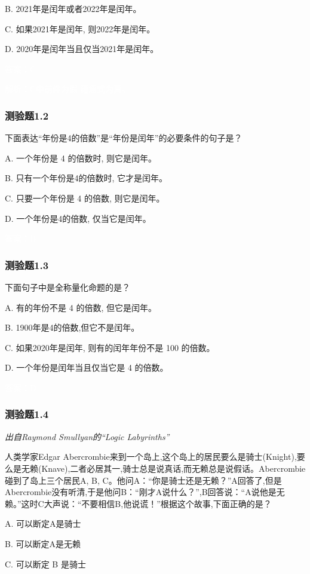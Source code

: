 \documentclass[UTF8, heading=true]{ctexart}
\begin{document}
B. 2021年是闰年或者2022年是闰年。

C. 如果2021年是闰年, 则2022年是闰年。

D. 2020年是闰年当且仅当2021年是闰年。

\textcolor{white}{答案：C}

\textcolor{white}{解析：C中前件为假,蕴涵式为真。}

\subsubsection{测验题1.2}
下面表达“年份是4的倍数”是“年份是闰年”的必要条件的句子是？

A. 一个年份是 4 的倍数时, 则它是闰年。

B. 只有一个年份是4的倍数时, 它才是闰年。

C. 只要一个年份是 4 的倍数, 则它是闰年。

D. 一个年份是4的倍数, 仅当它是闰年。

\textcolor{white}{答案：B}

\subsubsection{测验题1.3}

下面句子中是全称量化命题的是？

A. 有的年份不是 4 的倍数, 但它是闰年。

B. 1900年是4的倍数,但它不是闰年。

C. 如果2020年是闰年, 则有的闰年年份不是 100 的倍数。

D. 一个年份是闰年当且仅当它是 4 的倍数。

\textcolor{white}{答案：D}

\subsubsection{测验题1.4}

\textit{出自Raymond Smullyan的``Logic Labyrinths''}

人类学家Edgar Abercrombie来到一个岛上,这个岛上的居民要么是骑士(Knight),要么是无赖(Knave),二者必居其一,骑士总是说真话,而无赖总是说假话。Abercrombie碰到了岛上三个居民A, B, C。他问A：“你是骑士还是无赖？”A回答了,但是Abercrombie没有听清,于是他问B：“刚才A说什么？”,B回答说：“A说他是无赖。”这时C大声说：“不要相信B,他说谎！”根据这个故事,下面正确的是？

A. 可以断定A是骑士

B. 可以断定A是无赖

C. 可以断定 B 是骑士
\end{document}
